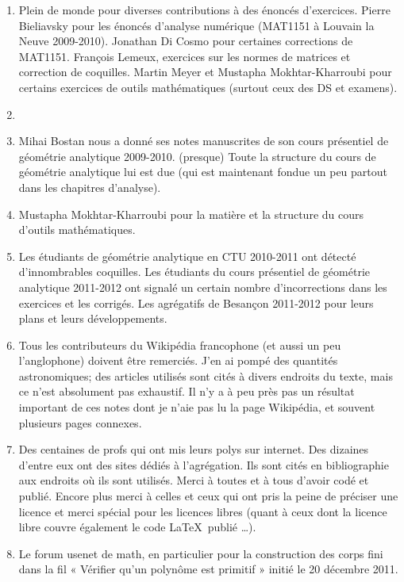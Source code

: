 \begin{description}
\begin{enumerate}
    \item
        Plein de monde pour diverses contributions à des énoncés d'exercices. Pierre Bieliavsky pour les énoncés d'analyse numérique (MAT1151 à Louvain la Neuve 2009-2010). Jonathan Di Cosmo pour certaines corrections de MAT1151. François Lemeux, exercices sur les normes de matrices et correction de coquilles. Martin Meyer et Mustapha Mokhtar-Kharroubi pour certains exercices de outils mathématiques (surtout ceux des DS et examens).
    \item 
    \item
        Mihai Bostan nous a donné ses notes manuscrites de son cours présentiel de géométrie analytique 2009-2010. (presque) Toute la structure du cours de géométrie analytique lui est due (qui est maintenant fondue un peu partout dans les chapitres d'analyse).
    \item
         Mustapha Mokhtar-Kharroubi pour la matière et la structure du cours d'outils mathématiques.
    \item
        Les étudiants de géométrie analytique en CTU 2010-2011 ont détecté d'innombrables coquilles.  Les étudiants du cours présentiel de géométrie analytique 2011-2012 ont signalé un certain nombre d'incorrections dans les exercices et les corrigés.  Les agrégatifs de Besançon 2011-2012 pour leurs plans et leurs développements.
    \item
        Tous les contributeurs du Wikipédia francophone (et aussi un peu l'anglophone) doivent être remerciés. J'en ai pompé des quantités astronomiques; des articles utilisés sont cités à divers endroits du texte, mais ce n'est absolument pas exhaustif. Il n'y a à peu près pas un résultat important de ces notes dont je n'aie pas lu la page Wikipédia, et souvent plusieurs pages connexes.
    \item
        Des centaines de profs qui ont mis leurs polys sur internet. Des dizaines d'entre eux ont des sites dédiés à l'agrégation. Ils sont cités en bibliographie aux endroits où ils sont utilisés. Merci à toutes et à tous d'avoir codé et publié. Encore plus merci à celles et ceux qui ont pris la peine de préciser une licence et merci spécial pour les licences libres (quant à ceux dont la licence libre couvre également le code \LaTeX\ publié \ldots).
    \item
        Le forum usenet de math, en particulier pour la construction des corps fini dans la fil « Vérifier qu'un polynôme est primitif » initié le 20 décembre 2011.

\end{enumerate}
\end{description}
